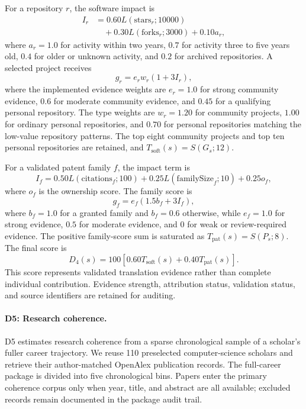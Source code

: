 \documentclass[letterpaper]{article} %
\begin{document}
For a repository $r$, the software impact is
\begin{equation}
\begin{aligned}
I_r&=0.60L(\mathrm{stars}_r;10000)\\
&\quad+0.30L(\mathrm{forks}_r;3000)+0.10a_r,
\end{aligned}
\end{equation}
where $a_r=1.0$ for activity within two years, $0.7$ for activity three to five
years old, $0.4$ for older or unknown activity, and $0.2$ for archived
repositories. A selected project receives
\begin{equation}
g_r=e_r w_r(1+3I_r),
\end{equation}
where the implemented evidence weights are $e_r=1.0$ for strong community
evidence, $0.6$ for moderate community evidence, and $0.45$ for a qualifying
personal repository. The type weights are $w_r=1.20$ for community projects,
$1.00$ for ordinary personal repositories, and $0.70$ for personal repositories
matching the low-value repository patterns. The top eight community projects and
top ten personal repositories are retained, and
$T_{\mathrm{soft}}(s)=S(G_s;12)$.

For a validated patent family $f$, the impact term is
\begin{equation}
I_f=0.50L(\mathrm{citations}_f;100)
 +0.25L(\mathrm{familySize}_f;10)+0.25o_f,
\end{equation}
where $o_f$ is the ownership score. The family score is
\begin{equation}
g_f=e_f(1.5b_f+3I_f),
\end{equation}
where $b_f=1.0$ for a granted family and $b_f=0.6$ otherwise, while
$e_f=1.0$ for strong evidence, $0.5$ for moderate evidence, and $0$ for weak
or review-required evidence. The positive family-score sum is saturated as
$T_{\mathrm{pat}}(s)=S(P_s;8)$. The final score is
\begin{equation}
D_4(s)=100[0.60T_{\mathrm{soft}}(s)+0.40T_{\mathrm{pat}}(s)].
\end{equation}
This score represents validated translation evidence rather than complete
individual contribution. Evidence strength, attribution status, validation
status, and source identifiers are retained for auditing.

\paragraph{D5: Research coherence.}
D5 estimates research coherence from a sparse chronological sample of a scholar's fuller career trajectory. We reuse 110 preselected computer-science scholars and retrieve their author-matched OpenAlex publication records. The full-career package is divided into five chronological bins. Papers enter the primary coherence corpus only when year, title, and abstract are all available; excluded records remain documented in the package audit trail.
\end{document}

